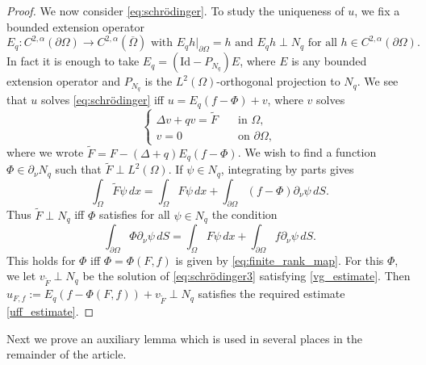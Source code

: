 \documentclass[11pt,a4paper]{amsart}
\theoremstyle{definition}
\numberwithin{equation}{section}
\newcommand{\ol}[1]{\overline{#1}}
\newcommand{\p}{\partial}
\newcommand{\Om}{\Omega}
\begin{document}
\begin{proof}
We now consider \eqref{eq:schrödinger}. To study the uniqueness of $u$, we fix a bounded extension operator
\[
E_q: C^{2,\alpha}(\p \Om) \to C^{2,\alpha}(\ol{\Om}) \text{ with $E_q h|_{\p \Om} = h$ and $E_q h \perp N_q$ for all $h \in C^{2,\alpha}(\p \Om)$}.
\]
In fact it is enough to take $E_q = (\mathrm{Id}-P_{N_q})E$, where $E$ is any bounded extension operator \cite[Theorem 3.3.3 and eq. 1) on p. 51]{Triebel1983} and $P_{N_q}$ is the $L^2(\Omega)$-orthogonal projection to $N_q$. We see that $u$ solves \eqref{eq:schrödinger} iff $u = E_q(f-\Phi) + v$, where $v$ solves 
\begin{equation}\label{eq:schrödinger3}
\begin{cases}
	\Delta v + qv = \tilde{F} \quad&\text{in }\Omega, \\
	v = 0 \quad&\text{on }\partial\Omega,
\end{cases}
\end{equation}
where we wrote $\tilde{F} = F - (\Delta+q)E_q(f-\Phi)$. We wish to find a function $\Phi \in \p_{\nu} N_q$ such that $\tilde{F} \perp L^2(\Om)$. If $\psi \in N_q$, integrating by parts gives 
\[
\int_{\Om} \tilde{F} \psi \,dx = \int_{\Om} F \psi \,dx + \int_{\p \Om} (f-\Phi) \p_{\nu} \psi \,dS.
\]
Thus $\tilde{F} \perp N_q$ iff $\Phi$ satisfies for all $\psi \in N_q$ the condition 
\[
\int_{\p \Om} \Phi \p_{\nu} \psi \,dS = \int_{\Om} F \psi \,dx + \int_{\p \Om} f \p_{\nu} \psi \,dS.
\]
This holds for $\Phi$ iff $\Phi = \Phi(F,f)$ is given by \eqref{eq:finite_rank_map}. For this $\Phi$, we let $v_{\tilde{F}} \perp N_q$ be the solution of \eqref{eq:schrödinger3} satisfying \eqref{vg_estimate}. Then $u_{F,f} := E_q(f-\Phi(F,f)) + v_{\tilde{F}} \perp N_q$ satisfies the required estimate \eqref{uff_estimate}.
\end{proof}

Next we prove an auxiliary lemma which is used in several places in the remainder of the article.
\end{document}
